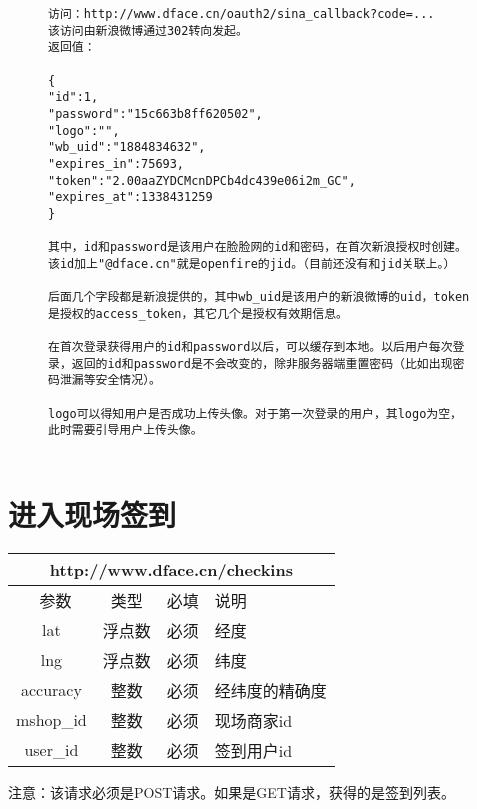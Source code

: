 \documentclass[cs4size]{ctexartutf8}
\begin{document}
\begin{figure}[H]
\begin{verbatim}
访问：http://www.dface.cn/oauth2/sina_callback?code=...
该访问由新浪微博通过302转向发起。
返回值：

{
"id":1,
"password":"15c663b8ff620502",
"logo":"",
"wb_uid":"1884834632",
"expires_in":75693,
"token":"2.00aaZYDCMcnDPCb4dc439e06i2m_GC",
"expires_at":1338431259
}

其中，id和password是该用户在脸脸网的id和密码，在首次新浪授权时创建。该id加上"@dface.cn"就是openfire的jid。（目前还没有和jid关联上。）

后面几个字段都是新浪提供的，其中wb_uid是该用户的新浪微博的uid，token是授权的access_token，其它几个是授权有效期信息。

在首次登录获得用户的id和password以后，可以缓存到本地。以后用户每次登录，返回的id和password是不会改变的，除非服务器端重置密码（比如出现密码泄漏等安全情况）。

logo可以得知用户是否成功上传头像。对于第一次登录的用户，其logo为空，此时需要引导用户上传头像。


\end{verbatim}
\end{figure}


\section{进入现场签到}

\begin{table}[H]
   \begin{center}
\begin{tabular}{|c|c|c|p{12cm}|}
\hline
\multicolumn{4}{|c|}{http://www.dface.cn/checkins} \\
\hline\hline
 \  参数  & 类型 & 必填 &  说明  \\
\hline
 lat  & 浮点数 & 必须 & 经度\\
\hline
 lng  &  浮点数 & 必须 & 纬度\\ 
\hline
 accuracy  & 整数 & 必须 & 经纬度的精确度\\ 
\hline
 mshop\_id  & 整数 & 必须 &  现场商家id\\ 
\hline
 user\_id  & 整数 & 必须 &  签到用户id\\ 
\hline
\end{tabular}
   \end{center}
\end{table}

注意：该请求必须是POST请求。如果是GET请求，获得的是签到列表。
\end{document}
